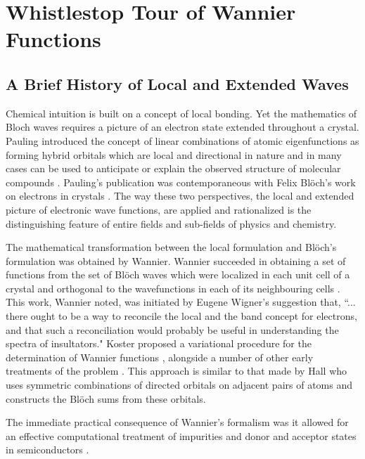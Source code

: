 \chapter{Whistlestop Tour of Wannier Functions}
\label{chap:wannier}
\section{A Brief History of Local and Extended Waves}
Chemical intuition is built on a concept of local bonding. 
Yet the mathematics of Bloch waves requires a picture of an 
electron state extended throughout a crystal.
Pauling introduced the concept of linear combinations of atomic eigenfunctions
as forming hybrid orbitals which are local and directional in nature and
in many cases can be used to anticipate or explain the observed structure
of molecular compounds \cite{pauling28}. Pauling's publication was contemporaneous
with Felix Bl\"och's work on electrons in crystals \cite{bloch29}. The
way these two perspectives, the local and extended picture of electronic wave functions, 
are applied and rationalized is the distinguishing feature 
of entire fields and sub-fields of physics and chemistry.

The mathematical transformation between the local formulation
and Bl\"och's formulation was obtained by Wannier. 
Wannier succeeded in obtaining a set of functions
from the set of Bl\"och waves which were localized in each unit cell
of a crystal and orthogonal to the wavefunctions in each of its
neighbouring cells \cite{wannier37, wannier62}. 
This work, Wannier noted, was initiated by Eugene Wigner's suggestion that, 
``... there ought to be a way to reconcile the local and the band concept 
for electrons, and that such a reconciliation would probably be useful in 
understanding the spectra of insultators." Koster proposed a variational
procedure for the determination of Wannier functions \cite{koster53},
alongside a number of other early treatments of the problem \cite{winston54}.
This approach is similar to that made by Hall \cite{hall52} who uses symmetric  
combinations of directed orbitals on adjacent pairs of atoms and constructs 
the Bl\"och sums from these orbitals.

The immediate practical consequence of Wannier's formalism was
it allowed for an effective computational treatment of impurities 
and donor and acceptor states in semiconductors \cite{slater49,kittel54}.

